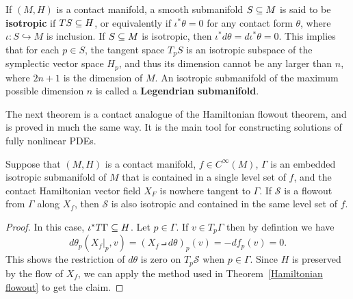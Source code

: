 If $(M,H)$ is a contact manifold, a smooth submanifold $S\subseteq M$ is said to be \textbf{isotropic} if $TS\subseteq H$, or equivalently if $\iota^*\theta=0$ for any contact form $\theta$, where $\iota:S\hookrightarrow M$ is inclusion. If $S\subseteq M$ is isotropic, then $\iota^*d\theta=d\iota^*\theta=0$. This implies that for each $p\in S$, the tangent space $T_pS$ is an isotropic subspace of the symplectic vector space $H_p$, and thus its dimension cannot be any larger than $n$, where $2n+1$ is the dimension of $M$. An isotropic submanifold of the maximum possible dimension $n$ is called a \textbf{Legendrian submanifold}.\par
The next theorem is a contact analogue of the Hamiltonian flowout theorem, and is proved in much the same way. It is the main tool for constructing solutions of fully nonlinear PDEs.
\begin{theorem}\label{contact flowout}
Suppose that $(M,H)$ is a contact manifold, $f\in C^\infty(M)$, $\Gamma$ is an embedded isotropic submanifold of $M$ that is contained in a single level set of $f$, and the contact Hamiltonian vector field $X_F$ is nowhere tangent to $\Gamma$. If $\mathcal{S}$ is a flowout from $\Gamma$ along $X_f$, then $\mathcal{S}$ is also isotropic and contained in the same level set of $f$.
\end{theorem}
\begin{proof}
In this case, $\iota^*T\Gamma\subseteq H$. Let $p\in\Gamma$. If $v\in T_p\Gamma$ then by defintion we have
\[d\theta_p(X_f|_p,v)=(X_f\intprod d\theta)_p(v)=-df_p(v)=0.\]
This shows the restriction of $d\theta$ is zero on $T_p\mathcal{S}$ when $p\in\Gamma$. Since $H$ is preserved by the flow of $X_f$, we can apply the method used in Theorem~\ref{Hamiltonian flowout} to get the claim.
\end{proof}
